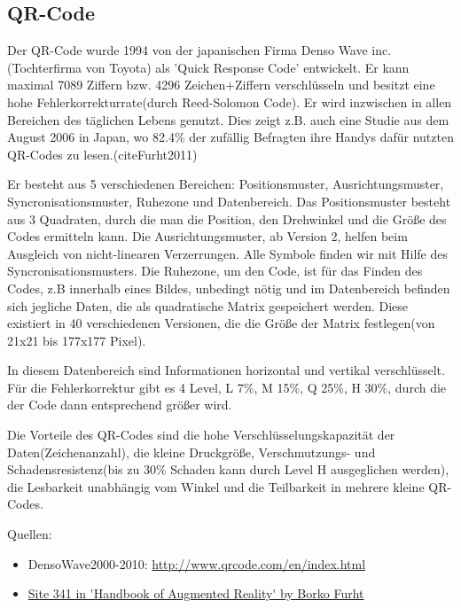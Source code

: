 \subsection*{QR-Code}
Der QR-Code wurde 1994 von der japanischen Firma Denso Wave inc.(Tochterfirma von Toyota) als 'Quick Response Code' entwickelt. Er kann maximal 7089 Ziffern bzw. 4296 Zeichen+Ziffern verschlüsseln und besitzt eine hohe Fehlerkorrekturrate(durch Reed-Solomon Code). Er wird inzwischen in allen Bereichen des täglichen Lebens genutzt. Dies zeigt z.B. auch eine Studie aus dem August 2006 in Japan, wo 82.4\% der zufällig Befragten ihre Handys dafür nutzten QR-Codes zu lesen.(cite{Furht2011})

Er besteht aus 5 verschiedenen Bereichen: Positionsmuster, Ausrichtungsmuster, Syncronisationsmuster, Ruhezone und Datenbereich. Das Positionsmuster besteht aus 3 Quadraten, durch die man die Position, den Drehwinkel und die Größe des Codes ermitteln kann. Die Ausrichtungsmuster, ab Version 2, helfen beim Ausgleich von nicht-linearen Verzerrungen. Alle Symbole finden wir mit Hilfe des Syncronisationsmusters. Die Ruhezone, um den Code, ist für das Finden des Codes, z.B innerhalb eines Bildes, unbedingt nötig und im Datenbereich befinden sich jegliche Daten, die als quadratische Matrix gespeichert werden. Diese existiert in 40 verschiedenen Versionen, die die Größe der Matrix festlegen(von 21x21 bis 177x177 Pixel).

In diesem Datenbereich sind Informationen horizontal und vertikal verschlüsselt.
Für die Fehlerkorrektur gibt es 4 Level, L 7\%, M 15\%, Q 25\%, H 30\%, durch die der Code dann entsprechend größer wird.

Die Vorteile des QR-Codes sind die hohe Verschlüsselungskapazität der Daten(Zeichenanzahl), die kleine Druckgröße, Verschmutzungs- und Schadensresistenz(bis zu 30\% Schaden kann durch Level H ausgeglichen werden), die Lesbarkeit unabhängig vom Winkel und die Teilbarkeit in mehrere kleine QR-Codes.

Quellen:
\begin{itemize}
	\item DensoWave2000-2010: \url{http://www.qrcode.com/en/index.html}
	\item \url{Site 341 in 'Handbook of Augmented Reality' by Borko Furht}
\end{itemize}